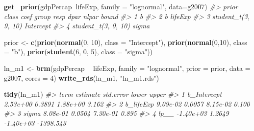 \documentclass[]{book}
\newenvironment{Shaded}{\begin{snugshade}}{\end{snugshade}}
\newcommand{\CommentTok}[1]{\textcolor[rgb]{0.56,0.35,0.01}{\textit{#1}}}
\newcommand{\DataTypeTok}[1]{\textcolor[rgb]{0.13,0.29,0.53}{#1}}
\newcommand{\DecValTok}[1]{\textcolor[rgb]{0.00,0.00,0.81}{#1}}
\newcommand{\KeywordTok}[1]{\textcolor[rgb]{0.13,0.29,0.53}{\textbf{#1}}}
\newcommand{\NormalTok}[1]{#1}
\newcommand{\OperatorTok}[1]{\textcolor[rgb]{0.81,0.36,0.00}{\textbf{#1}}}
\newcommand{\StringTok}[1]{\textcolor[rgb]{0.31,0.60,0.02}{#1}}
\begin{document}
\begin{Shaded}
\begin{Highlighting}[]
\KeywordTok{get_prior}\NormalTok{(gdpPercap}\OperatorTok{~}\NormalTok{lifeExp, }\DataTypeTok{family =} \StringTok{"lognormal"}\NormalTok{, }\DataTypeTok{data=}\NormalTok{g2007)}
\CommentTok{#>                 prior     class    coef group resp dpar nlpar bound}
\CommentTok{#> 1                             b                                    }
\CommentTok{#> 2                             b lifeExp                            }
\CommentTok{#> 3 student_t(3, 9, 10) Intercept                                    }
\CommentTok{#> 4 student_t(3, 0, 10)     sigma}
\end{Highlighting}
\end{Shaded}

\begin{Shaded}
\begin{Highlighting}[]
\NormalTok{prior <-}\StringTok{ }\KeywordTok{c}\NormalTok{(}\KeywordTok{prior}\NormalTok{(}\KeywordTok{normal}\NormalTok{(}\DecValTok{0}\NormalTok{, }\DecValTok{10}\NormalTok{), }\DataTypeTok{class =} \StringTok{"Intercept"}\NormalTok{),}
           \KeywordTok{prior}\NormalTok{(}\KeywordTok{normal}\NormalTok{(}\DecValTok{0}\NormalTok{,}\DecValTok{10}\NormalTok{), }\DataTypeTok{class =} \StringTok{"b"}\NormalTok{),}
           \KeywordTok{prior}\NormalTok{(}\KeywordTok{student}\NormalTok{(}\DecValTok{6}\NormalTok{, }\DecValTok{0}\NormalTok{, }\DecValTok{5}\NormalTok{), }\DataTypeTok{class =} \StringTok{"sigma"}\NormalTok{))}
\end{Highlighting}
\end{Shaded}

\begin{Shaded}
\begin{Highlighting}[]
\NormalTok{ln_m1 <-}\StringTok{ }\KeywordTok{brm}\NormalTok{(gdpPercap }\OperatorTok{~}\StringTok{ }\NormalTok{lifeExp, }\DataTypeTok{family =} \StringTok{"lognormal"}\NormalTok{, }\DataTypeTok{prior =}\NormalTok{ prior, }\DataTypeTok{data =}\NormalTok{ g2007, }\DataTypeTok{cores =} \DecValTok{4}\NormalTok{)}
\KeywordTok{write_rds}\NormalTok{(ln_m1, }\StringTok{"ln_m1.rds"}\NormalTok{)}
\end{Highlighting}
\end{Shaded}

\begin{Shaded}
\begin{Highlighting}[]
\KeywordTok{tidy}\NormalTok{(ln_m1)}
\CommentTok{#>          term  estimate std.error     lower     upper}
\CommentTok{#> 1 b_Intercept  2.53e+00    0.3891  1.88e+00     3.162}
\CommentTok{#> 2   b_lifeExp  9.09e-02    0.0057  8.15e-02     0.100}
\CommentTok{#> 3       sigma  8.08e-01    0.0504  7.30e-01     0.895}
\CommentTok{#> 4        lp__ -1.40e+03    1.2649 -1.40e+03 -1398.543}
\end{Highlighting}
\end{Shaded}
\end{document}
